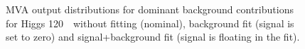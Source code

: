\begin{figure}[!hbtp]
\caption{
MVA output distributions for dominant background contributions for
Higgs 120~\GeV\ without fitting (nominal), background fit (signal is
set to zero) and signal+background fit (signal is floating in the
fit).}
\label{fig:bdt2_120}
\end{figure}

